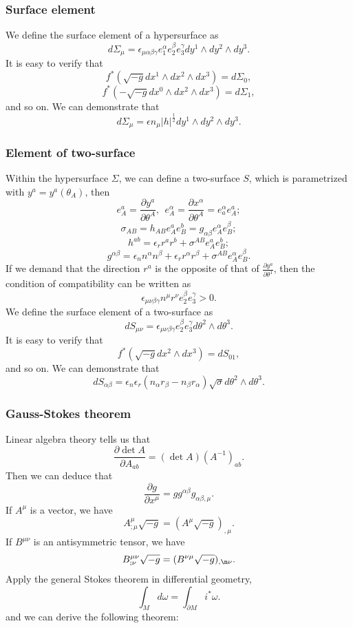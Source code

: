 \subsubsection{Surface element}
\noindent
We define the surface element of a hypersurface as
\[d\Sigma_{\mu} = \epsilon_{\mu \alpha \beta \gamma} e_{1}^{\alpha} e_{2}^{\beta} e_{3}^{\gamma} dy^1 \wedge dy^2 \wedge dy^3.\]
It is easy to verify that
\[f^*(\sqrt{-g} dx^1 \wedge dx^2 \wedge dx^3) = d\Sigma_0,\]
\[f^*(-\sqrt{-g} dx^0 \wedge dx^2 \wedge dx^3) = d\Sigma_1,\]
and so on.
We can demonstrate that
\[d\Sigma_{\mu} = \epsilon n_{\mu} |h|^{\frac{1}{2}} dy^1 \wedge dy^2 \wedge dy^3.\]

\subsubsection{Element of two-surface}
\noindent
Within the hypersurface $\Sigma$, we can define a two-surface $S$, which is parametrized with $y^a = y^a(\theta_A)$, then
\[e_A^a = \frac{\partial y^a}{\partial \theta^A}, \ \ e_A^{\alpha} = \frac{\partial x^{\alpha}}{\partial \theta^{A}} = e_a^{\alpha} e_A^a ;\]
\[\sigma_{AB} = h_{AB}e_A^a e_B^b = g_{\alpha \beta} e_A^{\alpha} e_B^{\beta};\]
\[h^{ab} = \epsilon_r r^a r^b + \sigma^{AB} e_A^a e_B^b;\]
\[g^{\alpha \beta} = \epsilon_n n^{\alpha} n^{\beta} + \epsilon_r r^{\alpha} r^{\beta} + \sigma^{AB} e_A^{\alpha} e_B^{\beta}.\]
If we demand that the direction $r^a$ is the opposite of that of $\frac{\partial y^a}{\partial \theta^{1}}$, then the condition of compatibility can be written as
\[\epsilon_{\mu \nu \beta \gamma}n^{\mu} r^{\nu} e_2^{\beta} e_3^{\gamma} > 0.\]
We define the surface element of a two-surface as
\[dS_{\mu \nu} = \epsilon_{\mu \nu \beta \gamma} e_2^{\beta} e_3^{\gamma} d\theta^2 \wedge d\theta^3.\]
It is easy to verify that
\[f^*(\sqrt{-g} dx^2 \wedge dx^3) = dS_{01},\]
and so on. We can demonstrate that
\[dS_{\alpha \beta} = \epsilon_n \epsilon_r (n_{\alpha}r_{\beta} - n_{\beta}r_{\alpha}) \sqrt{\sigma} d\theta^2 \wedge d\theta^3.\]

\subsubsection{Gauss-Stokes theorem}
Linear algebra theory tells us that
\[\frac{\partial \det A}{\partial A_{ab}} = (\det A) \left(A^{-1}\right)_{ab}.\]
Then we can deduce that
\[\frac{\partial g}{\partial x^{\mu}} = gg^{\alpha\beta} g_{\alpha\beta,\mu}.\]
If $A^{\mu}$ is a vector, we have
\[A^{\mu}_{;\mu}\sqrt{-g} = (A^{\mu}\sqrt{-g})_{,\mu}.\]
If $B^{\mu\nu}$ is an antisymmetric tensor, we have
\[B^{\mu\nu}_{;\nu}\sqrt{-g} = (B^{\nu\mu}\sqrt{-g})_{,\m\nu}.\]
Apply the general Stokes theorem in differential geometry,
\[\int_{M} d\omega = \int_{\partial M} i^* \omega.\]
and we can derive the following theorem:\\

